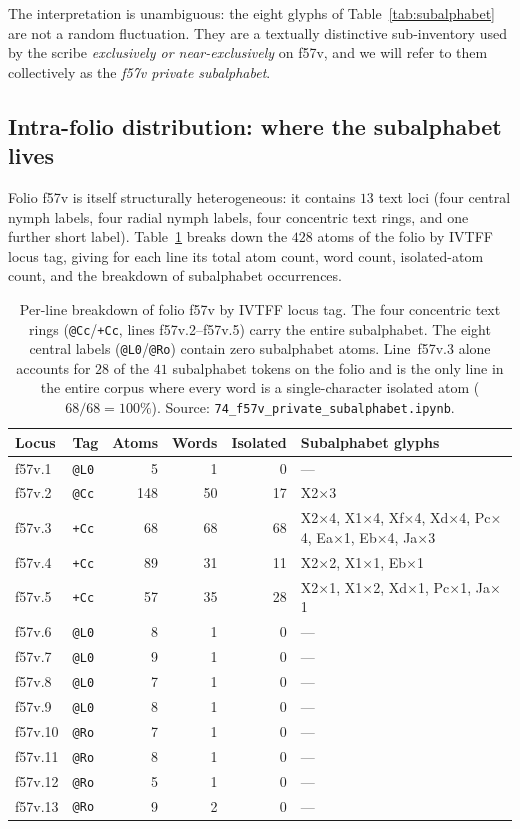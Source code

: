 The interpretation is unambiguous: the eight glyphs of
Table~\ref{tab:subalphabet} are not a random fluctuation. They are a textually
distinctive sub-inventory used by the scribe \emph{exclusively or near-exclusively}
on f57v, and we will refer to them collectively as the \emph{f57v private
subalphabet}.

\subsection{Intra-folio distribution: where the subalphabet lives}
\label{sec:intrafolio}

Folio f57v is itself structurally heterogeneous: it contains $13$ text loci
(four central nymph labels, four radial nymph labels, four concentric text
rings, and one further short label). Table~\ref{tab:perline} breaks down the
$428$ atoms of the folio by IVTFF locus tag, giving for each line its total
atom count, word count, isolated-atom count, and the breakdown of subalphabet
occurrences.

\begin{table}[h]
\centering
\small
\begin{tabular}{llrrrl}
\toprule
Locus & Tag & Atoms & Words & Isolated & Subalphabet glyphs \\
\midrule
f57v.1  & \texttt{@L0} & 5   & 1  & 0  & --- \\
f57v.2  & \texttt{@Cc} & 148 & 50 & 17 & X2$\times$3 \\
f57v.3  & \texttt{+Cc} & 68  & 68 & 68 & X2$\times$4, X1$\times$4, Xf$\times$4, Xd$\times$4, Pc$\times$4, Ea$\times$1, Eb$\times$4, Ja$\times$3 \\
f57v.4  & \texttt{+Cc} & 89  & 31 & 11 & X2$\times$2, X1$\times$1, Eb$\times$1 \\
f57v.5  & \texttt{+Cc} & 57  & 35 & 28 & X2$\times$1, X1$\times$2, Xd$\times$1, Pc$\times$1, Ja$\times$1 \\
f57v.6  & \texttt{@L0} & 8   & 1  & 0  & --- \\
f57v.7  & \texttt{@L0} & 9   & 1  & 0  & --- \\
f57v.8  & \texttt{@L0} & 7   & 1  & 0  & --- \\
f57v.9  & \texttt{@L0} & 8   & 1  & 0  & --- \\
f57v.10 & \texttt{@Ro} & 7   & 1  & 0  & --- \\
f57v.11 & \texttt{@Ro} & 8   & 1  & 0  & --- \\
f57v.12 & \texttt{@Ro} & 5   & 1  & 0  & --- \\
f57v.13 & \texttt{@Ro} & 9   & 2  & 0  & --- \\
\bottomrule
\end{tabular}
\caption{Per-line breakdown of folio f57v by IVTFF locus tag. The four
concentric text rings (\texttt{@Cc}/\texttt{+Cc}, lines f57v.2--f57v.5) carry
the entire subalphabet. The eight central labels (\texttt{@L0}/\texttt{@Ro})
contain zero subalphabet atoms. Line~f57v.3 alone accounts for $28$ of the
$41$ subalphabet tokens on the folio and is the only line in the entire
corpus where every word is a single-character isolated atom ($68/68 = 100\%$).
Source: \texttt{74\_f57v\_private\_subalphabet.ipynb}.}
\label{tab:perline}
\end{table}

